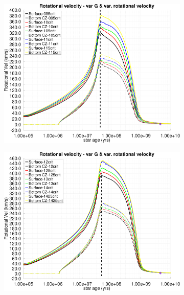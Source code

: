 \documentclass[fleqn,usenatbib]{mnras}
\begin{document}
\begin{figure}
    \centering
    \begin{subfigure}[h]{0.47\textwidth}
    \includegraphics[clip,width=\textwidth]{figures/paper2/rot_vel_var_vel_var_g1.pdf}
    \label{fig:subim21}
    \end{subfigure}
    \begin{subfigure}[h]{0.47\textwidth}
    \includegraphics[clip,width=\textwidth]{figures/paper2/rot_vel_var_vel_var_g3.pdf}
    \label{fig:subim22}
    \end{subfigure}
    \begin{subfigure}[h]{0.47\textwidth}

\end{subfigure}
\end{figure}
\end{document}
